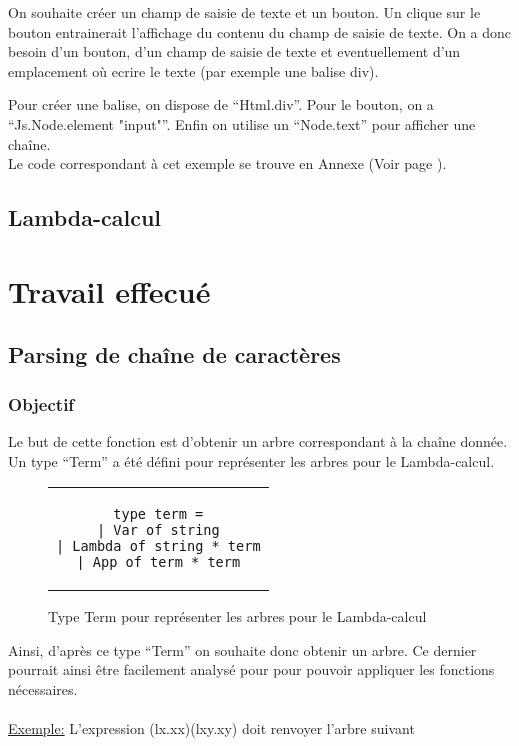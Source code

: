 \documentclass[a4paper,11pt,titlepage]{article}
\begin{document}
On souhaite créer un champ de saisie de texte et un bouton. Un clique sur le bouton entrainerait l'affichage du contenu du champ de saisie de texte. On a donc besoin d'un bouton, d'un champ de saisie de texte et eventuellement d'un emplacement où ecrire le texte (par exemple une balise div).

Pour créer une balise, on dispose de ``Html.div''. Pour le bouton, on a ``Js.Node.element "input"''. Enfin on utilise un ``Node.text'' pour afficher une chaîne.\\

Le code correspondant à cet exemple se trouve en Annexe (Voir page \pageref{tutoObrowser}).


\subsection{Lambda-calcul}

\newpage
\section{Travail effecué}

\subsection{Parsing de chaîne de caractères}

\subsubsection{Objectif}
Le but de cette fonction est d'obtenir un arbre correspondant à la chaîne donnée.\\

Un type ``Term'' a été défini pour représenter les arbres pour le Lambda-calcul.
\begin{figure}[H]
\begin{center}
\begin{tabular}{c}

 \begin{lstlisting}
type term =
| Var of string
| Lambda of string * term
| App of term * term
 \end{lstlisting}

\end{tabular}
\end{center}
\caption{Type Term pour représenter les arbres pour le Lambda-calcul}
 \label{term}
\end{figure}
Ainsi, d'après ce type ``Term'' on souhaite donc obtenir un arbre. Ce dernier pourrait ainsi être facilement analysé pour pour pouvoir appliquer les fonctions nécessaires.
\\
\\\underline{Exemple:} L'expression (lx.xx)(lxy.xy) doit renvoyer l'arbre suivant
\end{document}
